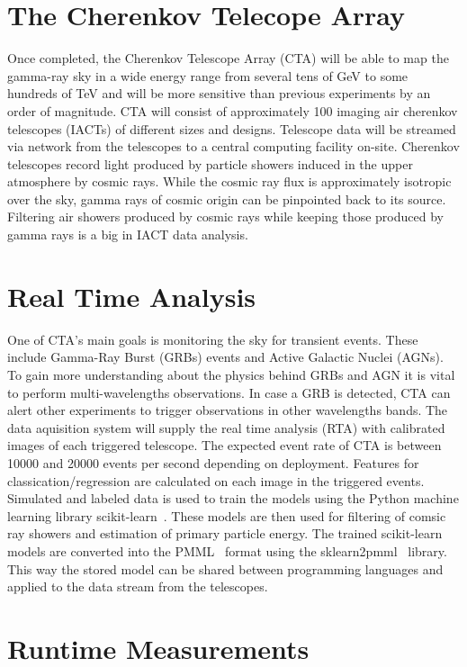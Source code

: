 \documentclass[11pt,twoside]{article}
\begin{document}
\section{The Cherenkov Telecope Array}
Once completed, the  Cherenkov Telescope Array (CTA)  will be able to map the gamma-ray sky
in a wide energy range from several tens of GeV to some hundreds of TeV and will be more sensitive
than previous experiments by an order of magnitude.
CTA will consist of approximately 100 imaging air cherenkov telescopes (IACTs) of different sizes and designs.
Telescope data will be streamed via network from the telescopes to a central computing facility
on-site.
Cherenkov telescopes record light produced by particle showers induced in the upper atmosphere by cosmic rays.
While the cosmic ray flux is approximately isotropic over the sky, gamma rays of cosmic origin can be pinpointed back to its source.
Filtering air showers produced by cosmic rays while keeping those produced by gamma rays is a big in IACT data analysis.



\section{Real Time Analysis}

One of CTA's main goals is monitoring the sky for transient events. These include Gamma-Ray Burst (GRBs) events and
Active Galactic Nuclei (AGNs).
To gain more understanding about the physics behind GRBs and AGN it is vital to perform multi-wavelengths observations.
In case a GRB is detected,  CTA can alert other experiments to trigger observations in other wavelengths bands.
The data aquisition system will supply the real time analysis (RTA) with calibrated images of each triggered telescope.
The expected event rate of CTA is between \num{10000} and \num{20000} events per second depending on deployment\cite{trigger}.
Features for classication/regression are calculated on each image in the triggered events.
Simulated and labeled data is used to train the models using the Python machine learning library scikit-learn~\citep{sklearn}.
These models are then used for filtering of comsic ray showers and estimation of primary particle energy.
The trained scikit-learn models are converted into the PMML~\citep{pmml} format using the sklearn2pmml~\citep{sklearn2pmml} library.
This way the stored model can be shared between programming languages and applied to the data stream from the telescopes.


\section{Runtime Measurements}





\end{document}
